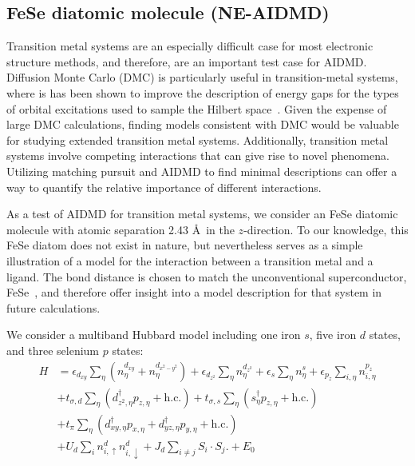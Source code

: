 \subsection{FeSe diatomic molecule (NE-AIDMD)}
\label{subsection:fese}
Transition metal systems are an especially difficult case for most electronic structure methods, and therefore, are an 
important test case for AIDMD. 
Diffusion Monte Carlo (DMC) is particularly useful in transition-metal systems, where is has been shown to improve the description of energy gaps for the types of orbital excitations used to sample the Hilbert space~\cite{lucas}.
Given the expense of large DMC calculations, finding models consistent with DMC would be valuable for studying extended transition metal systems. Additionally, transition metal systems involve competing interactions that can give rise to novel phenomena. 
Utilizing matching pursuit and AIDMD to find minimal descriptions can offer a way to quantify the relative importance of different interactions.

As a test of AIDMD for transition metal systems, we consider an FeSe diatomic molecule with atomic separation 2.43 \AA~in the $z$-direction.
To our knowledge, this FeSe diatom does not exist in nature, but nevertheless serves as a simple illustration of a model for the interaction between a transition metal and a ligand. The bond distance is chosen to match the unconventional superconductor, FeSe~\cite{fese}, and therefore offer insight into a model description for that system in future calculations.

We consider a multiband Hubbard model including one iron $s$, five iron $d$ states, and three selenium $p$ states:
\begin{align*}
  H 
  &=
  \epsilon_{d_{xy}} \sum_{\eta} (n^{d_{xy}}_{\eta}  + n^{d_{x^2-y^2}}_{\eta})
  +
  \epsilon_{d_{z^2}} \sum_{\eta} n^{d_{z^2}}_{\eta} 
  +
  \epsilon_s \sum_{\eta} n^{s}_{\eta} 
  +
  \epsilon_{p_{z}} \sum_{i,\eta} n^{p_{z}}_{i,\eta} 
  \\
  &+ 
  t_{\sigma,d} \sum_{\eta} \left( d_{z^2,\eta}^{\dagger} p_{z,\eta} + \text{h.c.} \right)
  +
  t_{\sigma,s} \sum_{\eta} \left(s_{\eta}^{\dagger}  p_{z,\eta} + \text{h.c.} \right)
  \\
  &+ 
  t_{\pi} \sum_{\eta} \left( d_{xy,\eta}^{\dagger} p_{x,\eta} + d_{yz,\eta}^{\dagger}  p_{y,\eta} + \text{h.c.} \right)
  \\
  &+
  U_d \sum_{i} n^{d}_{i,\uparrow} n^{d}_{i,\downarrow} 
  +
  J_d \sum_{i\ne j} S_i \cdot S_j.
  +
  E_0
\end{align*}

